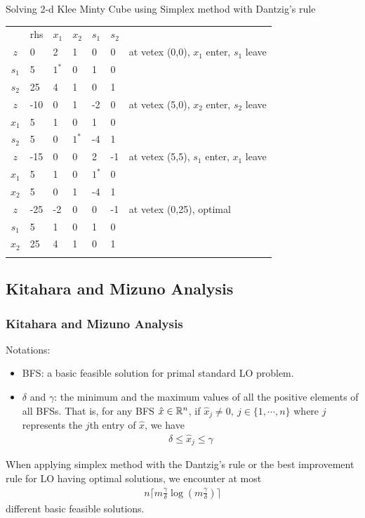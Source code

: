 \documentclass{beamer}
\begin{document}
\begin{frame}{Solving 2-d Klee Minty Cube using Simplex method with Dantzig's rule}
\centering
\begin{tabular}{c|llllll}
   & rhs & $x_1$ & $x_2$ & $s_1$ & $s_2$ &                 \\ \cline{1-6}
$z$  & 0   & 2  & 1  & 0  & 0  & at vetex (0,0), $x_1$ enter, $s_1$ leave  \\
$s_1$ & 5   & $1^*$  & 0  & 1  & 0  &                 \\
$s_2$ & 25  & 4  & 1  & 0  & 1  &                 \\ \hhline{======}
$z$  & -10 & 0  & 1  & -2 & 0  & at vetex (5,0), $x_2$ enter, $s_2$ leave  \\
$x_1$ & 5   & 1  & 0  & 1  & 0  &                 \\
$s_2$ & 5   & 0  & $1^*$  & -4 & 1  &                 \\ \hhline{======}
$z$  & -15 & 0  & 0  & 2  & -1 & at vetex (5,5),  $s_1$ enter, $x_1$ leave \\
$x_1$ & 5   & 1  & 0  & $1^*$  & 0  &                 \\
$x_2$ & 5   & 0  & 1  & -4 & 1  &                 \\ \hhline{======}
$z$  & -25 & -2 & 0  & 0  & -1 & at vetex (0,25), optimal \\
$s_1$ & 5   & 1  & 0  & 1  & 0  &                 \\
$x_2$ & 25  & 4  & 1  & 0  & 1  &                 \\ \hhline{======}
\end{tabular}
\end{frame}


\subsection{Kitahara and Mizuno Analysis}
\begin{frame}
\frametitle{Kitahara and Mizuno Analysis\cite{kitahara2013bound}}
Notations: 
\begin{itemize}
\item BFS: a basic feasible solution for primal standard LO problem.
\item $\delta$ and $\gamma$: the minimum and the maximum values of all the positive elements of all BFSs. That is, for any BFS $\hat{x} \in \mathbb{R}^{n}$, if $\hat{x}_j \neq 0, \ j \in \{1, \cdots, n\}$ where $j$ represents the $j$th entry of $\hat{x}$, we have 
\begin{align*}
\delta \le \hat{x}_j \le \gamma
\end{align*} 
\end{itemize}
\begin{theorem}
When applying simplex method with the Dantzig's rule or the best improvement rule for LO having optimal solutions, we encounter at most
\begin{align*}
n\lceil m \frac{\gamma}{\delta}\log(m\frac{\gamma}{\delta})\rceil \label{kmcomplexity}
\end{align*}
different basic feasible solutions. \label{KTheorem1}
\end{theorem}
\end{frame}
\end{document}
